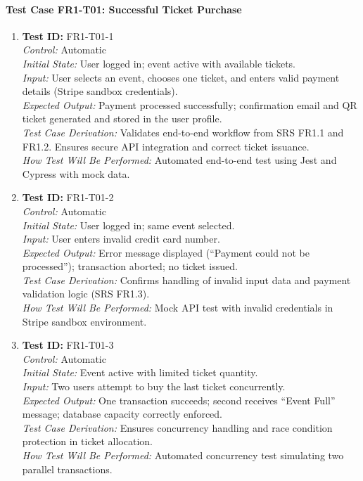 \documentclass[12pt, titlepage]{article}
\begin{document}
\paragraph{Test Case FR1-T01: Successful Ticket Purchase}

\begin{enumerate}\setlength{\itemsep}{1em}
    \item \textbf{Test ID:} FR1-T01-1\\[0.5em]
    \textit{Control:} Automatic\\[0.3em]
    \textit{Initial State:} User logged in; event active with available tickets.\\[0.3em]
    \textit{Input:} User selects an event, chooses one ticket, and enters valid payment details (Stripe sandbox credentials).\\[0.3em]
    \textit{Expected Output:} Payment processed successfully; confirmation email and QR ticket generated and stored in the user profile.\\[0.3em]
    \textit{Test Case Derivation:} Validates end-to-end workflow from SRS FR1.1 and FR1.2. Ensures secure API integration and correct ticket issuance.\\[0.3em]
    \textit{How Test Will Be Performed:} Automated end-to-end test using Jest and Cypress with mock data.

    \item \textbf{Test ID:} FR1-T01-2\\[0.5em]
    \textit{Control:} Automatic\\[0.3em]
    \textit{Initial State:} User logged in; same event selected.\\[0.3em]
    \textit{Input:} User enters invalid credit card number.\\[0.3em]
    \textit{Expected Output:} Error message displayed (“Payment could not be processed”); transaction aborted; no ticket issued.\\[0.3em]
    \textit{Test Case Derivation:} Confirms handling of invalid input data and payment validation logic (SRS FR1.3).\\[0.3em]
    \textit{How Test Will Be Performed:} Mock API test with invalid credentials in Stripe sandbox environment.

    \item \textbf{Test ID:} FR1-T01-3\\[0.5em]
    \textit{Control:} Automatic\\[0.3em]
    \textit{Initial State:} Event active with limited ticket quantity.\\[0.3em]
    \textit{Input:} Two users attempt to buy the last ticket concurrently.\\[0.3em]
    \textit{Expected Output:} One transaction succeeds; second receives “Event Full” message; database capacity correctly enforced.\\[0.3em]
    \textit{Test Case Derivation:} Ensures concurrency handling and race condition protection in ticket allocation.\\[0.3em]
    \textit{How Test Will Be Performed:} Automated concurrency test simulating two parallel transactions.


\end{enumerate}
\end{document}
